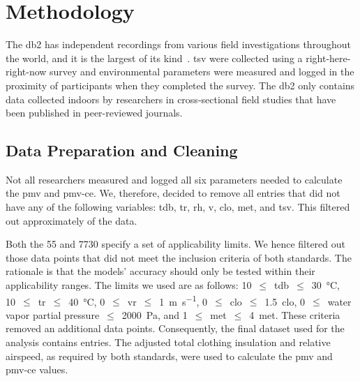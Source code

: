 \section{Methodology}\label{sec:methodology}
The \ac{db2} has  independent recordings from various field investigations throughout the world, and it is the largest of its kind~\cite{FoldvaryLicina2018, db2dryad}.
\Ac{tsv} were collected using a right-here-right-now survey and environmental parameters were measured and logged in the proximity of participants when they completed the survey.
The \ac{db2} only contains data collected indoors by researchers in cross-sectional field studies that have been published in peer-reviewed journals.

\subsection{Data Preparation and Cleaning}\label{subsec:data-processing-and-cleaning}
Not all researchers measured and logged all six parameters needed to calculate the \ac{pmv} and \ac{pmv-ce}.
We, therefore, decided to remove all entries that did not have any of the following variables: \ac{tdb}, \ac{tr}, \ac{rh}, \ac{v}, \ac{clo}, \ac{met}, and \ac{tsv}.
This filtered out approximately  of the data.

Both the \gls{55} and \gls{7730} specify a set of applicability limits.
We hence filtered out those data points that did not meet the inclusion criteria of both standards.
The rationale is that the models' accuracy should only be tested within their applicability ranges.
The limits we used are as follows:
\num{10}~$\leq$~\ac{tdb}~$\leq$~\qty{30}{\celsius},
\num{10}~$\leq$~\ac{tr}~$\leq$~\qty{40}{\celsius},
\num{0}~$\leq$~\ac{vr}~$\leq$~\qty{1}{\m\per\s},
\num{0}~$\leq$~\ac{clo}~$\leq$~\qty{1.5}{clo},
\num{0}~$\leq$~water vapor partial pressure~$\leq$~\qty{2000}{\pascal},
and \num{1}~$\leq$~\ac{met}~$\leq$~\qty{4}{met}.
These criteria removed an additional  data points.
Consequently, the final dataset used for the analysis contains  entries.
The adjusted total clothing insulation and relative airspeed, as required by both standards, were used to calculate the \ac{pmv} and \ac{pmv-ce} values.

